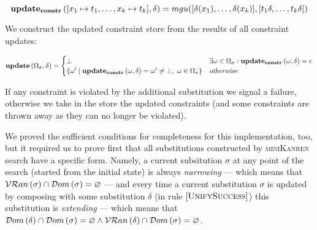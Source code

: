 \[ \mathbf{update_{constr}}\,([x_1 \mapsto t_1, \dots, x_k \mapsto t_k], \delta) = mgu([\delta(x_1), \dots, \delta(x_k)],[t_1 \delta, \dots, t_k \delta]) \]

We construct the updated constraint store from the results of all constraint updates:

\[
\mathbf{update}\,(\Omega_\sigma, \delta) =
\begin{cases}
  \bot                                                 & \exists \omega \in \Omega_\sigma: \mathbf{update_{constr}}\,(\omega, \delta) = \epsilon \\
  \{ \omega' \mid \mathbf{update_{constr}}\,(\omega, \delta) = \omega' \neq \bot, \; \omega \in \Omega_\sigma \}   & \textit{otherwise}
\end{cases}
\]

If any constraint is violated by the additional substitution we signal a failure, otherwise we take in the store the updated constraints
(and some constraints are thrown away as they can no longer be violated).

We proved the sufficient conditions for completeness for this implementation, too, but it required us to prove first that all substitutions constructed by \textsc{miniKanren} search have a specific form. Namely, a current subsitution $\sigma$ at any point of the search (started from the initial state) is always \emph{narrowing} --- which means that $\mathcal{VR}an\,({\sigma}) \cap \mathcal{D}om\,({\sigma}) = \varnothing$ --- and every time a current substitution $\sigma$ is updated by composing with some substitution $\delta$ (in rule $\mbox{[\textsc{UnifySuccess}]}$) this substitution is \emph{extending} --- which means that $\mathcal{D}om\,({\delta}) \cap \mathcal{D}om\,({\sigma}) = \varnothing \land \mathcal{VR}an\,({\delta}) \cap \mathcal{D}om\,({\sigma}) = \varnothing$.
